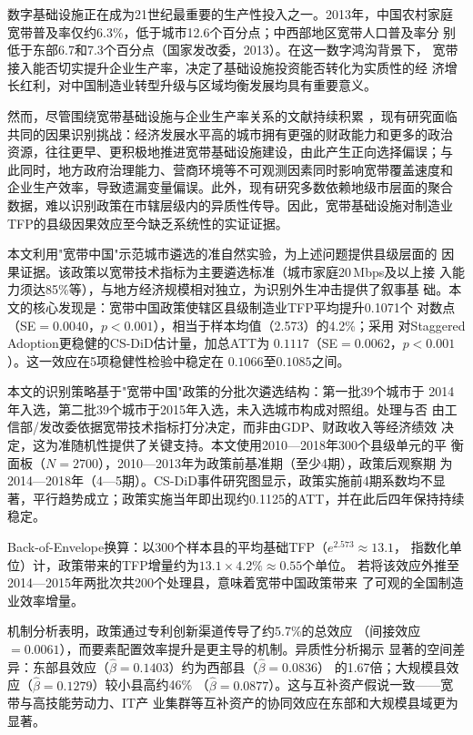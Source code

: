 \documentclass[12pt, a4paper]{article}
\begin{document}
数字基础设施正在成为21世纪最重要的生产性投入之一。2013年，中国农村家庭
宽带普及率仅约6.3\%，低于城市12.6个百分点；中西部地区宽带人口普及率分
别低于东部6.7和7.3个百分点（国家发改委，2013）。在这一数字鸿沟背景下，
宽带接入能否切实提升企业生产率，决定了基础设施投资能否转化为实质性的经
济增长红利，对中国制造业转型升级与区域均衡发展均具有重要意义。

然而，尽管围绕宽带基础设施与企业生产率关系的文献持续积累
\citep{hjort2019arrival, cui2022broadband, tan2022digital}，现有研究面临
共同的因果识别挑战：经济发展水平高的城市拥有更强的财政能力和更多的政治
资源，往往更早、更积极地推进宽带基础设施建设，由此产生正向选择偏误；与
此同时，地方政府治理能力、营商环境等不可观测因素同时影响宽带覆盖速度和
企业生产效率，导致遗漏变量偏误。此外，现有研究多数依赖地级市层面的聚合
数据，难以识别政策在市辖层级内的异质性传导。因此，宽带基础设施对制造业
TFP的县级因果效应至今缺乏系统性的实证证据。

本文利用"宽带中国"示范城市遴选的准自然实验，为上述问题提供县级层面的
因果证据。该政策以宽带技术指标为主要遴选标准（城市家庭20\,Mbps及以上接
入能力须达85\%等），与地方经济规模相对独立，为识别外生冲击提供了叙事基
础。本文的核心发现是：宽带中国政策使辖区县级制造业TFP平均提升0.1071个
对数点（SE$=0.0040$，$p<0.001$），相当于样本均值（2.573）的4.2\%；采用
对Staggered Adoption更稳健的CS-DiD估计量，加总ATT为
$0.1117$（SE$=0.0062$，$p<0.001$）。这一效应在5项稳健性检验中稳定在
$0.1066$至$0.1085$之间。

本文的识别策略基于"宽带中国"政策的分批次遴选结构：第一批39个城市于
2014年入选，第二批39个城市于2015年入选，未入选城市构成对照组。处理与否
由工信部/发改委依据宽带技术指标打分决定，而非由GDP、财政收入等经济绩效
决定，这为准随机性提供了关键支持。本文使用2010—2018年300个县级单元的平
衡面板（$N=2700$），2010—2013年为政策前基准期（至少4期），政策后观察期
为2014—2018年（4—5期）。CS-DiD事件研究图显示，政策实施前4期系数均不显
著，平行趋势成立；政策实施当年即出现约0.1125的ATT，并在此后四年保持持续
稳定。

Back-of-Envelope换算：以300个样本县的平均基础TFP（$e^{2.573}\approx13.1$，
指数化单位）计，政策带来的TFP增量约为$13.1\times4.2\%\approx0.55$个单位。
若将该效应外推至2014—2015年两批次共200个处理县，意味着宽带中国政策带来
了可观的全国制造业效率增量。

机制分析表明，政策通过专利创新渠道传导了约5.7\%的总效应
（间接效应$=0.0061$），而要素配置效率提升是更主导的机制。异质性分析揭示
显著的空间差异：东部县效应（$\hat\beta=0.1403$）约为西部县（$\hat\beta=0.0836$）
的1.67倍；大规模县效应（$\hat\beta=0.1279$）较小县高约46\%
（$\hat\beta=0.0877$）。这与互补资产假说一致——宽带与高技能劳动力、IT产
业集群等互补资产的协同效应在东部和大规模县域更为显著。
\end{document}
